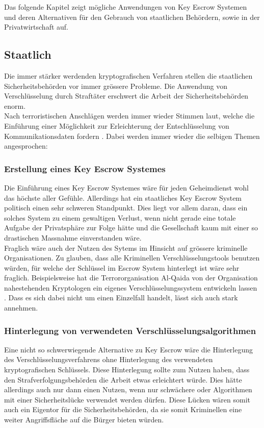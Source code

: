 Das folgende Kapitel zeigt mögliche Anwendungen von Key Escrow Systemen und deren Alternativen für den Gebrauch von staatlichen Behördern, sowie in der Privatwirtschaft auf.
	
	\subsection{Staatlich}
Die immer stärker werdenden kryptografischen Verfahren stellen die staatlichen Sicherheitsbehörden vor immer grössere Probleme. Die Anwendung von Verschlüsselung durch Straftäter erschwert die Arbeit der Sicherheitsbehörden enorm. \\
Nach terroristischen Anschlägen werden immer wieder Stimmen laut, welche die Einführung einer Möglichkeit zur Erleichterung der Entschlüsselung von Kommunikationsdaten fordern \cite{insideit} \cite{annabiselli} \cite{denning}. 
Dabei werden immer wieder die selbigen Themen angesprochen:

	\subsubsection{Erstellung eines Key Escrow Systemes}
Die Einführung eines Key Escrow Systemes wäre für jeden Geheimdienst wohl das höchste aller Gefühle. Allerdings hat ein staatliches Key Escrow System politisch einen sehr schweren Standpunkt. Dies liegt vor allem daran, dass ein solches System zu einem gewaltigen Verlust, wenn nicht gerade eine totale Aufgabe der Privatsphäre zur Folge hätte und die Gesellschaft kaum mit einer so drastischen Massnahme einverstanden wäre.\cite {insideit} \\
Fraglich wäre auch der Nutzen des Sytems im Hinsicht auf grössere kriminelle Organisationen. Zu glauben, dass alle Kriminellen Verschlüsselungstools benutzen würden, für welche der Schlüssel im Escrow System hinterlegt ist wäre sehr fraglich. Beispielsweise hat die Terrororganisation Al-Qaida von der Organisation nahestehenden Kryptologen ein eigenes Verschlüsselungssystem entwickeln lassen \cite{denning}. Dass es sich dabei nicht um einen Einzelfall handelt, lässt sich auch stark annehmen.
	
	\subsubsection{Hinterlegung von verwendeten Verschlüsselungsalgorithmen}
Eine nicht so schwerwiegende Alternative zu Key Escrow wäre die Hinterlegung des Verschlüsselungsverfahrens ohne Hinterlegung des verwendeten kryptografischen Schlüssels. Diese Hinterlegung sollte zum Nutzen haben, dass den Strafverfolgungsbehörden die Arbeit etwas erleichtert würde. Dies hätte allerdings auch nur dann einen Nutzen, wenn nur schwächere oder Algorithmen mit einer Sicherheitslücke verwendet werden dürfen. Diese Lücken wären somit auch ein Eigentor für die Sicherheitsbehörden, da sie somit Kriminellen eine weiter Angriffsfläche auf die Bürger bieten würden. \cite{adminch} %


